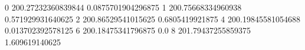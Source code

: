 0 200.27232360839844 0.0875701904296875
1 200.75668334960938 0.571929931640625
2 200.86529541015625 0.6805419921875
4 200.19845581054688 0.013702392578125
6 200.18475341796875 0.0
8 201.79437255859375 1.609619140625
